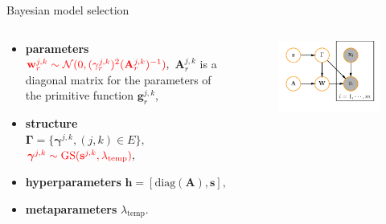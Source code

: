 \documentclass[usenames,dvipsnames,11pt,pdf,utf8,russian,aspectratio=169]{beamer}
\begin{document}
\begin{frame}{Bayesian model selection}


\begin{columns}
\begin{column}{0.6\textwidth}
\begin{itemize}
\item \textbf{parameters} \\ $\textcolor{red}{\mathbf{w}_r^{j,k} \sim \mathcal{N}(0, (\gamma_{r}^{j,k})^2 (\mathbf{A}_r^{j,k})^{-1})},$
$\mathbf{A}_r^{j,k}$ is a diagonal matrix for the parameters of the primitive function $\mathbf{g}_r^{j,k}$,
\item \textbf{structure} \\$\boldsymbol{\Gamma} = \{\boldsymbol{\gamma}^{j,k}, (j,k) \in E\},$ \\$\textcolor{red}{\boldsymbol{\gamma}^{j,k} \sim \text{GS}(\mathbf{s}^{j,k}, \lambda_\text{temp})},$ 
\item \textbf{hyperparameters} $\mathbf{h} = [\text{diag}(\mathbf{A}), \mathbf{s} ],$
\item \textbf{metaparameters} $\lambda_\text{temp}$.
\end{itemize}

\end{column}


\begin{column}{0.4\textwidth}
\begin{figure}
\includegraphics[width=\textwidth]{simple_plate_concrete.pdf}
\end{figure}
\end{column}

\end{columns}

%

\end{frame}
\end{document}
